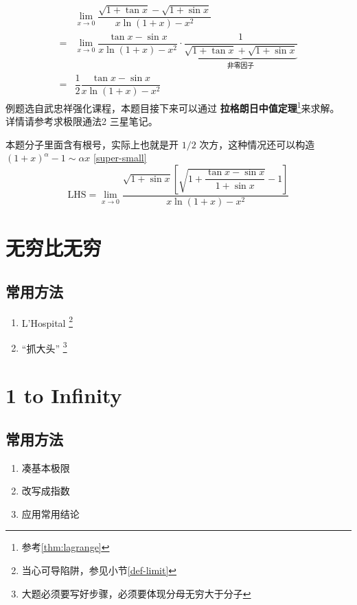 \begin{example}
    \label{ex:limit-simplify-and-sqrt-substitution-example-1}

    \begin{align*}
        &\lim_{x \to 0} \dfrac{\sqrt{1+\tan{x}} - \sqrt{1+\sin{x}}}{x \ln{(1+x)} - x^2} \\
        =&\lim_{x \to 0} \dfrac{\tan{x} - \sin{x}}{x \ln{(1+x)} - x^2} \cdot
        \underbrace{\dfrac{1}{\sqrt{1+\tan{x}} + \sqrt{1+\sin{x}}}}_{\mbox{非零因子}}\\
        =&\dfrac{1}{2} \dfrac{\tan{x} - \sin{x}}{x \ln{(1+x)} - x^2}
    \end{align*}
    例题选自武忠祥强化课程，本题目接下来可以通过
    \textbf{拉格朗日中值定理}\footnote{参考\ref{thm:lagrange}}来求解。
    详情请参考求极限通法2 三星笔记。

    本题分子里面含有根号，实际上也就是开 $1/2$ 次方，这种情况还可以构造
    $(1+x)^\alpha - 1 \sim \alpha x$
    \ref{super-small}
    \begin{equation*}
        \mbox{LHS} = \lim_{x \to 0}
        \dfrac{\sqrt{1+\sin{x}}\left[ 
            \sqrt{1+\dfrac{\tan{x}-\sin{x}}{1+\sin{x}}}	- 1
            \right] }{x \ln{(1+x)} - x^2}
    \end{equation*}
\end{example}

\section{无穷比无穷}

\subsection{常用方法}

\begin{enumerate}
    \item L'Hospital \footnote{当心可导陷阱，参见小节\ref{def-limit}}
	\item “抓大头”
        \footnote{大题必须要写好步骤，必须要体现分母无穷大于分子}
\end{enumerate}

\section{1 to Infinity}
\subsection{常用方法}
\begin{enumerate}
	\item 凑基本极限
	\item 改写成指数
	\item 应用常用结论
\end{enumerate}

